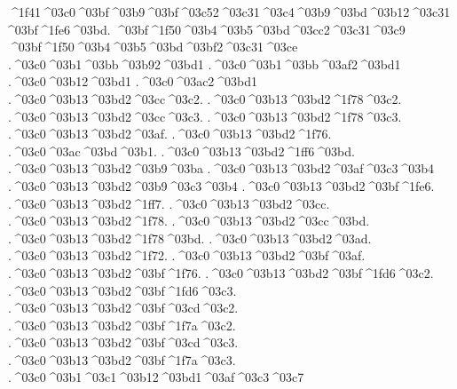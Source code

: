 { ^^^^1f41^^^^03c0^^^^03bf^^^^03b9^^^^03bf^^^^03c52^^^^03c31^^^^03c4^^^^03b9^^^^03bd^^^^03b12^^^^03c31^^^^03bf^^^^1fe6^^^^03bd.	%
^^^^03bf^^^^1f50^^^^03b4^^^^03b5^^^^03bd^^^^03cc2^^^^03c31^^^^03c9 		%
^^^^03bf^^^^1f50^^^^03b4^^^^03b5^^^^03bd^^^^03bf2^^^^03c31^^^^03ce 		
.^^^^03c0^^^^03b1^^^^03bb^^^^03b92^^^^03bd1 		%
.^^^^03c0^^^^03b1^^^^03bb^^^^03af2^^^^03bd1 		%
.^^^^03c0^^^^03b12^^^^03bd1
.^^^^03c0^^^^03ac2^^^^03bd1
	.^^^^03c0^^^^03b13^^^^03bd2^^^^03cc^^^^03c2. 		%
	.^^^^03c0^^^^03b13^^^^03bd2^^^^1f78^^^^03c2.
	.^^^^03c0^^^^03b13^^^^03bd2^^^^03cc^^^^03c3.
	.^^^^03c0^^^^03b13^^^^03bd2^^^^1f78^^^^03c3.
	.^^^^03c0^^^^03b13^^^^03bd2^^^^03af.
	.^^^^03c0^^^^03b13^^^^03bd2^^^^1f76.
	.^^^^03c0^^^^03ac^^^^03bd^^^^03b1.
	.^^^^03c0^^^^03b13^^^^03bd2^^^^1ff6^^^^03bd.
	.^^^^03c0^^^^03b13^^^^03bd2^^^^03b9^^^^03ba  		%
	.^^^^03c0^^^^03b13^^^^03bd2^^^^03af^^^^03c3^^^^03b4 		%
	.^^^^03c0^^^^03b13^^^^03bd2^^^^03b9^^^^03c3^^^^03b4  		%
	.^^^^03c0^^^^03b13^^^^03bd2^^^^03bf^^^^1fe6. 		%
	.^^^^03c0^^^^03b13^^^^03bd2^^^^1ff7.
	.^^^^03c0^^^^03b13^^^^03bd2^^^^03cc.
	.^^^^03c0^^^^03b13^^^^03bd2^^^^1f78.
	.^^^^03c0^^^^03b13^^^^03bd2^^^^03cc^^^^03bd.
	.^^^^03c0^^^^03b13^^^^03bd2^^^^1f78^^^^03bd.
	.^^^^03c0^^^^03b13^^^^03bd2^^^^03ad.
	.^^^^03c0^^^^03b13^^^^03bd2^^^^1f72.
	.^^^^03c0^^^^03b13^^^^03bd2^^^^03bf^^^^03af.
	.^^^^03c0^^^^03b13^^^^03bd2^^^^03bf^^^^1f76.
	.^^^^03c0^^^^03b13^^^^03bd2^^^^03bf^^^^1fd6^^^^03c2.
	.^^^^03c0^^^^03b13^^^^03bd2^^^^03bf^^^^1fd6^^^^03c3.
	.^^^^03c0^^^^03b13^^^^03bd2^^^^03bf^^^^03cd^^^^03c2.
	.^^^^03c0^^^^03b13^^^^03bd2^^^^03bf^^^^1f7a^^^^03c2.
	.^^^^03c0^^^^03b13^^^^03bd2^^^^03bf^^^^03cd^^^^03c3.
	.^^^^03c0^^^^03b13^^^^03bd2^^^^03bf^^^^1f7a^^^^03c3.
.^^^^03c0^^^^03b1^^^^03c1^^^^03b12^^^^03bd1^^^^03af^^^^03c3^^^^03c7 		%
}
